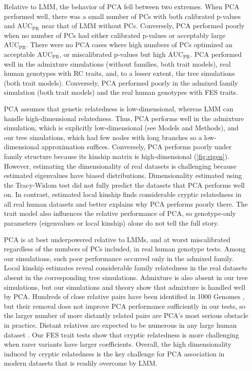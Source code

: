\documentclass[11pt]{article}
\newcommand{\auc}{\text{AUC}_\text{PR}}
\begin{document}
Relative to LMM, the behavior of PCA fell between two extremes.
When PCA performed well, there was a small number of PCs with both calibrated p-values and $\auc$ near that of LMM without PCs.
Conversely, PCA performed poorly when no number of PCs had either calibrated p-values or acceptably large $\auc$.
There were no PCA cases where high numbers of PCs optimized an acceptable $\auc$, or miscalibrated p-values but high $\auc$.
PCA performed well in the admixture simulations (without families, both trait models), real human genotypes with RC traits, and, to a lesser extent, the tree simulations (both trait models).
Conversely, PCA performed poorly in the admixed family simulation (both trait models) and the real human genotypes with FES traits.

PCA assumes that genetic relatedness is low-dimensional, whereas LMM can handle high-dimensional relatedness.
Thus, PCA performs well in the admixture simulation, which is explicitly low-dimensional (see Models and Methods), and our tree simulations, which had few nodes with long branches so a low-dimensional approximation suffices.
Conversely, PCA performs poorly under family structure because its kinship matrix is high-dimensional (\cref{fig:eigen}).
However, estimating the dimensionality of real datasets is challenging because estimated eigenvalues have biased distributions.
Dimensionality estimated using the Tracy-Widom test \citep{patterson_population_2006} did not fully predict the datasets that PCA performs well on.
In contrast, estimated local kinship finds considerable cryptic relatedness in all real human datasets and better explains why PCA performs poorly there.
The trait model also influences the relative performance of PCA, so genotype-only parameters (eigenvalues or local kinship) alone do not tell the full story.

PCA is at best underpowered relative to LMMs, and at worst miscalibrated regardless of the numbers of PCs included, in real human genotype tests.
Among our simulations, such poor performance occurred only in the admixed family.
Local kinship estimates reveal considerable family relatedness in the real datasets absent in the corresponding tree simulations.
Admixture is also absent in our tree simulations, but our simulations and theory show that admixture is handled well by PCA.
Hundreds of close relative pairs have been identified in 1000 Genomes \citep{gazal_high_2015, al-khudhair_inference_2015, fedorova_atlas_2016, schlauch_identification_2017}, but their removal does not improve PCA performance sufficiently in our tests, so the larger number of more distantly related pairs are PCA's most serious obstacle in practice.
Distant relatives are expected to be numerous in any large human dataset \citep{henn_cryptic_2012, shchur_number_2018}.
Our FES trait tests show that cryptic relatedness is more challenging when rarer variants have larger coefficients.
Overall, the high dimensionality induced by cryptic relatedness is the key challenge for PCA association in modern datasets that is readily overcome by LMM.
\end{document}
